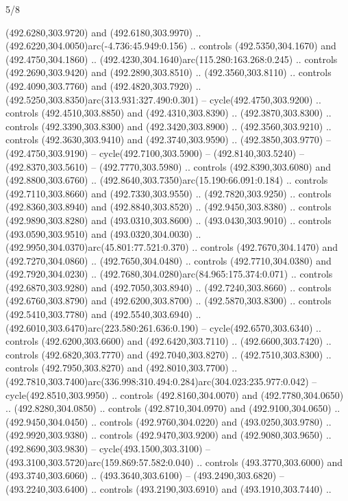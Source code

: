 \begin{flagdescription}{5/8}
\begin{scope}[xshift=0.5\flaglength,yshift=0.5\flagwidth,scale=\flagwidth/475.63]
\begin{scope}[y=0.8pt, x=0.8pt, yscale=-1, xscale=1,shift={(-450,-300)}]
\begin{scope}[cm={{1.0,0.0,0.0,1.0,(-0.0002,0.12556)}},cm={{1.0,0.0,0.0,1.0,(0.00179,0.0)}}]
\begin{scope}[cm={{1.11592,0.0,0.0,1.11592,(-106.89933,-41.77764)}}]
\begin{scope}[draw=black,fill=cfff]
\begin{scope}[fill=black]
  (492.6280,303.9720) and (492.6180,303.9970) ..
  (492.6220,304.0050)arc(-4.736:45.949:0.156) .. controls (492.5350,304.1670)
  and (492.4750,304.1860) .. (492.4230,304.1640)arc(115.280:163.268:0.245) ..
  controls (492.2690,303.9420) and (492.2890,303.8510) .. (492.3560,303.8110) ..
  controls (492.4090,303.7760) and (492.4820,303.7920) ..
  (492.5250,303.8350)arc(313.931:327.490:0.301) -- cycle(492.4750,303.9200) ..
  controls (492.4510,303.8850) and (492.4310,303.8390) .. (492.3870,303.8300) ..
  controls (492.3390,303.8300) and (492.3420,303.8900) .. (492.3560,303.9210) ..
  controls (492.3630,303.9410) and (492.3740,303.9590) .. (492.3850,303.9770) --
  (492.4750,303.9190) -- cycle(492.7100,303.5900) -- (492.8140,303.5240) --
  (492.8370,303.5610) -- (492.7770,303.5980) .. controls (492.8390,303.6080) and
  (492.8800,303.6760) .. (492.8640,303.7350)arc(15.190:66.091:0.184) .. controls
  (492.7110,303.8660) and (492.7330,303.9550) .. (492.7820,303.9250) .. controls
  (492.8360,303.8940) and (492.8840,303.8520) .. (492.9450,303.8380) .. controls
  (492.9890,303.8280) and (493.0310,303.8600) .. (493.0430,303.9010) .. controls
  (493.0590,303.9510) and (493.0320,304.0030) ..
  (492.9950,304.0370)arc(45.801:77.521:0.370) .. controls (492.7670,304.1470)
  and (492.7270,304.0860) .. (492.7650,304.0480) .. controls (492.7710,304.0380)
  and (492.7920,304.0230) .. (492.7680,304.0280)arc(84.965:175.374:0.071) ..
  controls (492.6870,303.9280) and (492.7050,303.8940) .. (492.7240,303.8660) ..
  controls (492.6760,303.8790) and (492.6200,303.8700) .. (492.5870,303.8300) ..
  controls (492.5410,303.7780) and (492.5540,303.6940) ..
  (492.6010,303.6470)arc(223.580:261.636:0.190) -- cycle(492.6570,303.6340) ..
  controls (492.6200,303.6600) and (492.6420,303.7110) .. (492.6600,303.7420) ..
  controls (492.6820,303.7770) and (492.7040,303.8270) .. (492.7510,303.8300) ..
  controls (492.7950,303.8270) and (492.8010,303.7700) ..
  (492.7810,303.7400)arc(336.998:310.494:0.284)arc(304.023:235.977:0.042) --
  cycle(492.8510,303.9950) .. controls (492.8160,304.0070) and
  (492.7780,304.0650) .. (492.8280,304.0850) .. controls (492.8710,304.0970) and
  (492.9100,304.0650) .. (492.9450,304.0450) .. controls (492.9760,304.0220) and
  (493.0250,303.9780) .. (492.9920,303.9380) .. controls (492.9470,303.9200) and
  (492.9080,303.9650) .. (492.8690,303.9830) -- cycle(493.1500,303.3100) --
  (493.3100,303.5720)arc(159.869:57.582:0.040) .. controls (493.3770,303.6000)
  and (493.3740,303.6060) .. (493.3640,303.6100) -- (493.2490,303.6820) --
  (493.2240,303.6400) .. controls (493.2190,303.6910) and (493.1910,303.7440) ..

\end{scope}
\end{scope}
\end{scope}
\end{scope}
\end{scope}
\end{scope}
\end{flagdescription}
